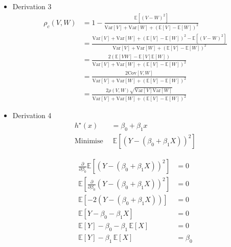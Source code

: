 \documentclass{article}
\begin{document}
\begin{itemize}
\begin{align*}
        &= \frac{\text{Cov}[Y, \mathbb{\text{E}}[Y|X]]}{\sqrt{\text{Var}[Y]\text{Var}[\mathbb{\text{E}}[Y|X]]}}\\
        &= \rho(Y, \mathbb{\text{E}}[Y|X])\\ 
    \end{align*}
    \item Derivation 3
    \begin{align*}
        \rho_c(V, W) &= 1 - \frac{\mathbb{\text{E}}[(V - W)^2]}{\text{Var}[V] + \text{Var}[W] + (\mathbb{\text{E}}[V] - \mathbb{\text{E}}[W])^2}\\
        &= \frac{\text{Var}[V] + \text{Var}[W] + (\mathbb{\text{E}}[V] - \mathbb{\text{E}}[W])^2 - \mathbb{\text{E}}[(V - W)^2]}{\text{Var}[V] + \text{Var}[W] + (\mathbb{\text{E}}[V] - \mathbb{\text{E}}[W])^2}\\
        &= \frac{2(\mathbb{\text{E}}[VW] - \mathbb{\text{E}}[V]\mathbb{\text{E}}[W])}{\text{Var}[V] + \text{Var}[W] + (\mathbb{\text{E}}[V] - \mathbb{\text{E}}[W])^2} \\
        &= \frac{2\text{Cov}[V, W]}{\text{Var}[V] + \text{Var}[W] + (\mathbb{\text{E}}[V] - \mathbb{\text{E}}[W])^2}\\
        &= \frac{2\rho(V, W)\sqrt{\text{Var}[V]\text{Var}[W]}}{\text{Var}[V] + \text{Var}[W] + (\mathbb{\text{E}}[V] - \mathbb{\text{E}}[W])^2}
    \end{align*}
    \item Derivation 4
    \begin{align*}
    h^{\star}(x) &= \beta_0 + \beta_1 x \\[4pt]
    \text{Minimise } &\ \mathbb{\text{E}}\left[(Y-(\beta_0+\beta_1 X))^2\right]
    \end{align*}
    
    \begin{align*}
        \frac{\partial}{\partial \beta_0}\mathbb{\text{E}}\left[(Y-(\beta_0+\beta_1 X))^2\right] &= 0 \\
        \mathbb{\text{E}}\left[\frac{\partial}{\partial \beta_0}(Y-(\beta_0+\beta_1 X))^2\right] &= 0 \\
        \mathbb{\text{E}}\left[-2(Y-(\beta_0+\beta_1 X))\right] &= 0 \\
        \mathbb{\text{E}}[Y-\beta_0-\beta_1 X] &= 0 \\
        \mathbb{\text{E}}[Y] - \beta_0 - \beta_1\,\mathbb{\text{E}}[X] &= 0 \\
        \mathbb{\text{E}}[Y] - \beta_1\,\mathbb{\text{E}}[X] &= \beta_0
    \end{align*}
    

\end{itemize}
\end{document}

